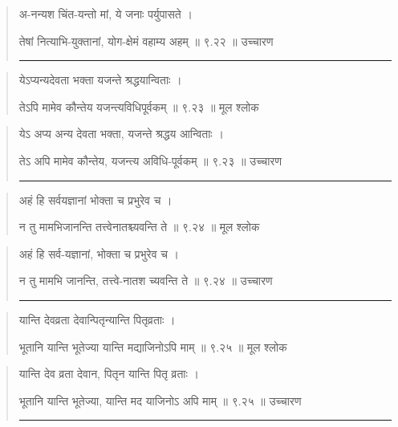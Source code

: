 \begin{quotation}

अ-नन्यश चिंत-यन्तो मां, ये जनाः पर्युपासते  ।  

तेषां नित्याभि-युक्तानां, योग-क्षेमं वहाम्य अहम्‌  ॥ ९.२२ ॥  उच्चारण

\noindent\rule{16cm}{0.4pt} 
\end{quotation}


\begin{quotation} 


येऽप्यन्यदेवता भक्ता यजन्ते श्रद्धयान्विताः  ।  

तेऽपि मामेव कौन्तेय यजन्त्यविधिपूर्वकम्‌  ॥ ९.२३ ॥  मूल श्लोक
\end{quotation}

\begin{quotation}

येऽ अप्य अन्य देवता भक्ता, यजन्ते श्रद्धय आन्विताः  ।  

तेऽ अपि मामेव कौन्तेय, यजन्त्य अविधि-पूर्वकम्‌  ॥ ९.२३ ॥  उच्चारण

\noindent\rule{16cm}{0.4pt} 
\end{quotation}


\begin{quotation} 

अहं हि सर्वयज्ञानां भोक्ता च प्रभुरेव च  ।  

न तु मामभिजानन्ति तत्त्वेनातश्च्यवन्ति ते  ॥ ९.२४ ॥  मूल श्लोक
\end{quotation}

\begin{quotation}

अहं हि सर्व-यज्ञानां, भोक्ता च प्रभुरेव च  ।  

न तु मामभि जानन्ति, तत्त्वे-नातश च्यवन्ति ते  ॥ ९.२४ ॥  उच्चारण

\noindent\rule{16cm}{0.4pt} 
\end{quotation}


\begin{quotation} 

यान्ति देवव्रता देवान्पितृन्यान्ति पितृव्रताः  ।  

भूतानि यान्ति भूतेज्या यान्ति मद्याजिनोऽपि माम्‌  ॥ ९.२५ ॥  मूल श्लोक
\end{quotation}

\begin{quotation}

यान्ति देव व्रता देवान, पितृन यान्ति पितृ व्रताः  ।  

भूतानि यान्ति भूतेज्या, यान्ति मद याजिनोऽ अपि माम्‌  ॥ ९.२५ ॥  उच्चारण

\noindent\rule{16cm}{0.4pt} 
\end{quotation}


